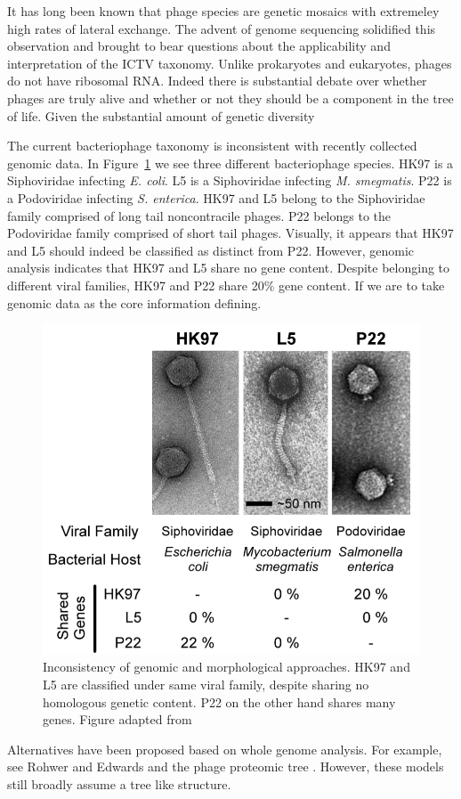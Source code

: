 It has long been known that phage species are genetic mosaics with extremeley high rates of lateral exchange.
The advent of genome sequencing solidified this observation and brought to bear questions about the applicability and interpretation of the ICTV taxonomy.
Unlike prokaryotes and eukaryotes, phages do not have ribosomal RNA.
Indeed there is substantial debate over whether phages are truly alive and whether or not they should be a component in the tree of life.
Given the substantial amount of genetic diversity 

The current bacteriophage taxonomy is inconsistent with recently collected genomic data.
In Figure~\ref{phage:fig:inconsistency} we see three different bacteriophage species.
HK97 is a Siphoviridae infecting \emph{E. coli}.
L5 is a Siphoviridae infecting \emph{M. smegmatis}.
P22 is a Podoviridae infecting \emph{S. enterica}.
HK97 and L5 belong to the Siphoviridae family comprised of long tail noncontracile phages.
P22 belongs to the Podoviridae family comprised of short tail phages.
Visually, it appears that HK97 and L5 should indeed be classified as distinct from P22.
However, genomic analysis indicates that HK97 and L5 share no gene content.
Despite belonging to different viral families, HK97 and P22 share 20\% gene content.
If we are to take genomic data as the core information defining.

\begin{figure}
\centering
\includegraphics[width=.5\linewidth]{./fig/LAWRENCE_phage_comparative.png}
\caption[Inconsistency of morphological classification in bacteriophage.]{Inconsistency of genomic and morphological approaches. HK97 and L5 are classified under same viral family, despite sharing no homologous genetic content. P22 on the other hand shares many genes. Figure adapted from \parencite{Lawrence:2002eg}}
\label{phage:fig:inconsistency}
\end{figure}

Alternatives have been proposed based on whole genome analysis.
For example, see Rohwer and Edwards and the phage proteomic tree \cite{Rohwer:2002uo}.
However, these models still broadly assume a tree like structure.

